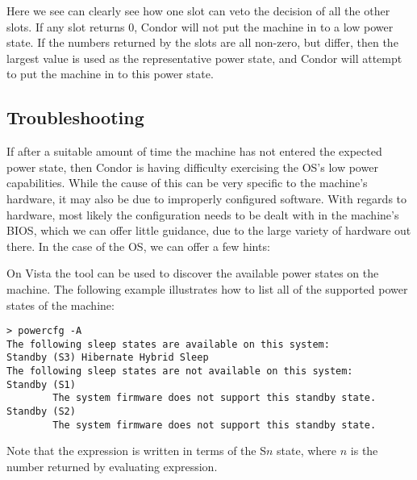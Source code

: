 Here we see can clearly see how one slot can veto the decision of all the 
other slots.  If any slot returns $0$, Condor will not put the machine in 
to a low power state.  If the numbers returned by the slots are all non-zero, 
but differ, then the largest value is used as the representative power 
state, and Condor will attempt to put the machine in to this power state.


\subsection{Troubleshooting}

If after a suitable amount of time the machine has not entered the expected 
power state, then Condor is having difficulty exercising the OS's low power 
capabilities.  While the cause of this can be very specific to the machine's
hardware, it may also be due to improperly configured software.  
With regards to hardware, most likely the configuration needs to be dealt with
in the machine's BIOS, which we can offer little guidance, due to the 
large variety of hardware out there.  In the case of the OS, we can offer
a few hints:

On Vista the  tool can be used to discover the available 
power states on the machine.  The following example illustrates how to
list all of the supported power states of the machine:

\begin{verbatim}
> powercfg -A
The following sleep states are available on this system: 
Standby (S3) Hibernate Hybrid Sleep
The following sleep states are not available on this system:
Standby (S1)
        The system firmware does not support this standby state.
Standby (S2)
        The system firmware does not support this standby state.
\end{verbatim}

Note that the  expression is written in terms of the 
S$n$ state, where $n$ is the number returned by evaluating expression.

